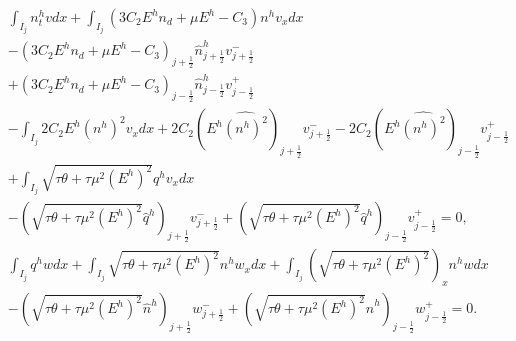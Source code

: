 \begin{align}
     & \int_{I_{j}} n_{t}^{h} v d x+\int_{I_{j}}\left(3 C_{2} E^{h} n_{d}+\mu E^{h}-C_{3}\right) n^{h} v_{x} d x                                                                   \nonumber                                                                                                \\
     & -\left(3 C_{2} E^{h} n_{d}+\mu E^{h}-C_{3}\right)_{j+\frac{1}{2}} \hat{n}_{j+\frac{1}{2}}^{h} v_{j+\frac{1}{2}}^{-}                                                                                                                                    \nonumber                     \\
     & +\left(3 C_{2} E^{h} n_{d}+\mu E^{h}-C_{3}\right)_{j-\frac{1}{2}} \hat{n}_{j-\frac{1}{2}}^{h} v_{j-\frac{1}{2}}^{+}                                                                                                                                   \nonumber                      \\
     & -\int_{I_{j}} 2 C_{2} E^{h}\left(n^{h}\right)^{2} v_{x} d x+2 C_{2}\left(E^{h} \widehat{\left(n^{h}\right)^{2}}\right)_{j+\frac{1}{2}} v_{j+\frac{1}{2}}^{-}-2 C_{2}\left(E^{h} \widehat{\left(n^{h}\right)^{2}}\right)_{j-\frac{1}{2}} v_{j-\frac{1}{2}}^{+} \nonumber              \\
     & +\int_{I_{j}} \sqrt{\tau \theta+\tau \mu^{2}\left(E^{h}\right)^{2}} q^{h} v_{x} d x                                                                                                                                                 \nonumber                                        \\
     & -\left(\sqrt{\tau \theta+\tau \mu^{2}\left(E^{h}\right)^{2}} \hat{q}^{h}\right)_{j+\frac{1}{2}} v_{j+\frac{1}{2}}^{-}+\left(\sqrt{\tau \theta+\tau \mu^{2}\left(E^{h}\right)^{2}} \hat{q}^{h}\right)_{j-\frac{1}{2}} v_{j-\frac{1}{2}}^{+}=0,             \label{eq:HFRewrittenLDGa} \\
     & \int_{I_{j}} q^{h} w d x+\int_{I_{j}} \sqrt{\tau \theta+\tau \mu^{2}\left(E^{h}\right)^{2}} n^{h} w_{x} d x+\int_{I_{j}}\left(\sqrt{\tau \theta+\tau \mu^{2}\left(E^{h}\right)^{2}}\right)_{x} n^{h} w d x                        \nonumber                                          \\
     & -\left(\sqrt{\tau \theta+\tau \mu^{2}\left(E^{h}\right)^{2}} \hat{n}^{h}\right)_{j+\frac{1}{2}} w_{j+\frac{1}{2}}^{-}+\left(\sqrt{\tau \theta+\tau \mu^{2}\left(E^{h}\right)^{2}} \hat{n}^{h}\right)_{j-\frac{1}{2}} w_{j-\frac{1}{2}}^{+}=0 .\label{eq:HFRewrittenLDGb}
\end{align}
